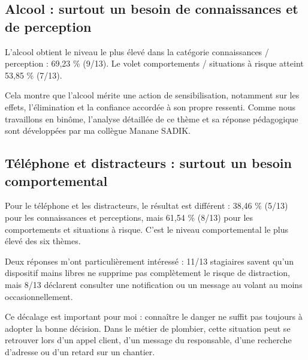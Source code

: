\subsection{Alcool : surtout un besoin de connaissances et de perception}

L’alcool obtient le niveau le plus élevé dans la catégorie connaissances / perception : 69,23 \% (9/13). Le volet comportements / situations à risque atteint 53,85 \% (7/13).

Cela montre que l’alcool mérite une action de sensibilisation, notamment sur les effets, l’élimination et la confiance accordée à son propre ressenti. Comme nous travaillons en binôme, l’analyse détaillée de ce thème et sa réponse pédagogique sont développées par ma collègue Manane SADIK.

\subsection{Téléphone et distracteurs : surtout un besoin comportemental}

Pour le téléphone et les distracteurs, le résultat est différent : 38,46 \% (5/13) pour les connaissances et perceptions, mais 61,54 \% (8/13) pour les comportements et situations à risque. C’est le niveau comportemental le plus élevé des six thèmes.

Deux réponses m’ont particulièrement intéressé : 11/13 stagiaires savent qu’un dispositif mains libres ne supprime pas complètement le risque de distraction, mais 8/13 déclarent consulter une notification ou un message au volant au moins occasionnellement.

Ce décalage est important pour moi : connaître le danger ne suffit pas toujours à adopter la bonne décision. Dans le métier de plombier, cette situation peut se retrouver lors d’un appel client, d’un message du responsable, d’une recherche d’adresse ou d’un retard sur un chantier.
